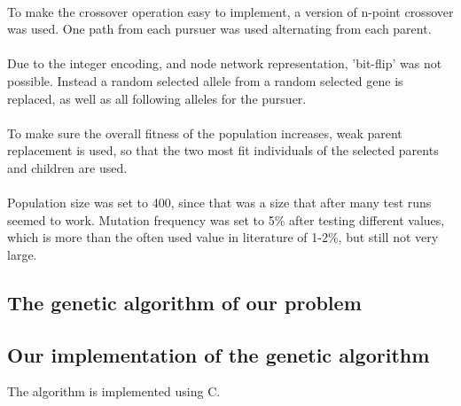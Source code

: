 \\To make the crossover operation easy to implement, a version of n-point crossover was used. One path from each pursuer was used alternating from each parent.\\
\\Due to the integer encoding, and node network representation, 'bit-flip' was not possible. Instead a random selected allele from a random selected gene is replaced, as well as all following alleles for the pursuer.\\
\\To make sure the overall fitness of the population increases, weak parent replacement is used, so that the two most fit individuals of the selected parents and children are used.\\
\\Population size was set to 400, since that was a size that after many test runs seemed to work. Mutation frequency was set to 5\% after testing different values, which is more than the often used value in literature \cite{GAHandbook2} of 1-2\%, but still not very large.

\subsection{The genetic algorithm of our problem}

\subsection{Our implementation of the genetic algorithm}
The algorithm is implemented using C. 

